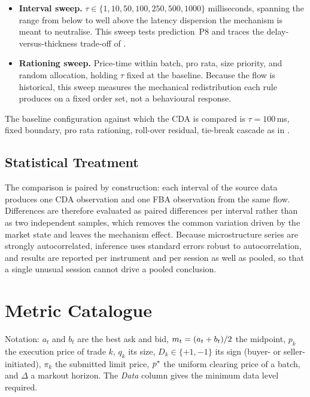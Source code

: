 \begin{itemize}
  \item \textbf{Interval sweep.} $\tau \in \{1, 10, 50, 100, 250, 500,
  1000\}$ milliseconds, spanning the range from below to well above the
  latency dispersion the mechanism is meant to neutralise. This sweep
  tests prediction~P8 and traces the delay-versus-thickness trade-off of
  .
  \item \textbf{Rationing sweep.} Price-time within batch, pro rata,
  size priority, and random allocation, holding $\tau$ fixed at the
  baseline. Because the flow is historical, this sweep measures the
  mechanical redistribution each rule produces on a fixed order set, not
  a behavioural response.
\end{itemize}

The baseline configuration against which the CDA is compared is
$\tau = 100$\,ms, fixed boundary, pro rata rationing, roll-over
residual, tie-break cascade as in .

\subsection{Statistical Treatment}

The comparison is paired by construction: each interval of the source
data produces one CDA observation and one FBA observation from the same
flow. Differences are therefore evaluated as paired differences per
interval rather than as two independent samples, which removes the
common variation driven by the market state and leaves the mechanism
effect. Because microstructure series are strongly autocorrelated,
inference uses standard errors robust to autocorrelation, and results
are reported per instrument and per session as well as pooled, so that
a single unusual session cannot drive a pooled conclusion.

\section{Metric Catalogue}
\label{sec:metrics}

Notation: $a_t$ and $b_t$ are the best ask and bid, $m_{t} = (a_t+b_t)/2$
the midpoint, $p_k$ the execution price of trade $k$, $q_k$ its size,
$D_k \in \{+1,-1\}$ its sign (buyer- or seller-initiated), $\pi_k$ the
submitted limit price, $p^{\ast}$ the uniform clearing price of a batch, and
$\Delta$ a markout horizon. The \emph{Data} column gives the minimum
data level required.

